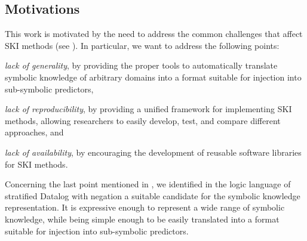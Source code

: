 \subsection{Motivations}\label{subsec:psyki-motivations}
%
This work is motivated by the need to address the common challenges that affect \gls{SKI} methods (see ).
%
In particular, we want to address the following points:
%
\begin{inlinelist}
    \item \emph{lack of generality}, by providing the proper tools to automatically translate symbolic knowledge of arbitrary domains into a format suitable for injection into sub-symbolic predictors,
    \item \emph{lack of reproducibility}, by providing a unified framework for implementing \gls{SKI} methods, allowing researchers to easily develop, test, and compare different approaches, and
    \item \emph{lack of availability}, by encouraging the development of reusable software libraries for \gls{SKI} methods.
\end{inlinelist}
%
Concerning the last point mentioned in , we identified in the logic language of stratified Datalog with negation a suitable candidate for the symbolic knowledge representation.
%
It is expressive enough to represent a wide range of symbolic knowledge, while being simple enough to be easily translated into a format suitable for injection into sub-symbolic predictors.


